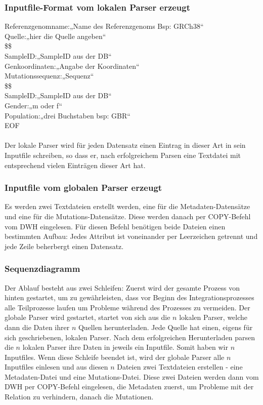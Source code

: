 \subsubsection{Inputfile-Format vom lokalen Parser erzeugt}
Referenzgenomname:„Name des Referenzgenoms Bsp: GRCh38“\\
Quelle:„hier die Quelle angeben“\\
\$\$\\
SampleID:„SampleID aus der DB“\\
Genkoordinaten:„Angabe der Koordinaten“ \\
Mutationssequenz:„Sequenz“\\
\$\$\\
SampleID:„SampleID aus der DB“\\
Gender:„m oder f“\\
Population:„drei Buchstaben bsp: GBR“ \\
EOF\\
\\
Der lokale Parser wird für jeden Datensatz einen Eintrag in dieser Art in sein Inputfile schreiben, so dass er, nach erfolgreichem Parsen eine Textdatei mit entsprechend vielen Einträgen dieser Art hat.\\
\subsubsection{Inputfile vom globalen Parser erzeugt}
Es werden zwei Textdateien erstellt werden, eine für die Metadaten-Datensätze und eine für die Mutations-Datensätze. Diese werden danach per COPY-Befehl vom DWH eingelesen. Für diesen Befehl benötigen beide Dateien einen bestimmten Aufbau: Jedes Attribut ist voneinander per Leerzeichen getrennt und jede Zeile beherbergt einen Datensatz.
\subsubsection{Sequenzdiagramm}
Der Ablauf besteht aus zwei Schleifen: Zuerst wird der gesamte Prozess von hinten gestartet, um zu gewährleisten, dass vor Beginn des Integrationsprozesses alle Teilprozesse laufen um Probleme während des Prozesses zu vermeiden. Der globale Parser wird gestartet, startet von sich aus die $n$ lokalen Parser, welche dann die Daten ihrer $n$ Quellen herunterladen. Jede Quelle hat einen, eigens für sich geschriebenen, lokalen Parser. Nach dem erfolgreichen Herunterladen parsen die $n$ lokalen Parser ihre Daten in jeweils ein Inputfile. Somit haben wir $n$ Inputfiles. Wenn diese Schleife beendet ist, wird der globale Parser alle $n$ Inputfiles einlesen und aus diesen $n$ Dateien zwei Textdateien erstellen - eine Metadaten-Datei und eine Mutations-Datei. Diese zwei Dateien werden dann vom DWH per COPY-Befehl eingelesen, die Metadaten zuerst, um Probleme mit der Relation zu verhindern, danach die Mutationen.
\newpage
